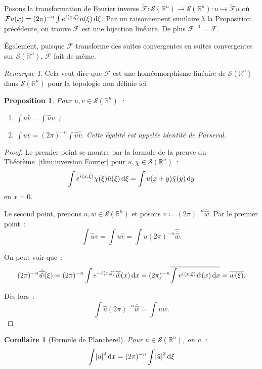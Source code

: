 \documentclass{report}
\newcommand{\R}{{\mathbb R}}
\newcommand{\scpr}[2]{\left\langle#1, #2\right\rangle}
\newcommand{\dx}{\dif x}
\newtheorem{prp}[thm]{Proposition}
\newtheorem{cor}[thm]{Corollaire}
\theoremstyle{definition}
\theoremstyle{remark}
\newtheorem*{rmq}{Remarque}
\begin{document}
Posons la transformation de Fourier inverse $\tilde {\mathcal F} : \mathcal S(\R^n) \to \mathcal S(\R^n) : u \mapsto \tilde {\mathcal F}u$ où
$\tilde {\mathcal F}u(x) = (2\pi)^{-n}\int e^{i\scpr x\xi}u(\xi)\dif\xi$. Par un raisonnement similaire à la Proposition précédente,
on trouve $\tilde {\mathcal F}$ est une bijection linéaire. De plus $\mathcal F^{-1} = \tilde {\mathcal F}$.

Également, puisque $\mathcal F$ transforme des suites convergentes en suites convergentes sur $\mathcal S(\R^n)$, $\tilde {\mathcal F}$ fait de même.

\begin{rmq} Cela veut dire que $\mathcal F$ est une homéomorphisme linéaire de $\mathcal S(\R^n)$ dans $\mathcal S(\R^n)$ pour la topologie non définie ici.
\end{rmq}

\begin{prp} Pour $u, v \in \mathcal S(\R^n)$~:
\begin{enumerate}
	\item $\int u\hat v = \int\hat uv$~;
	\item $\int u\overline v = (2\pi)^{-n}\int \hat u\hat {\overline v}$. Cette égalité est appelée \textit{identité de Parseval}.
\end{enumerate}
\end{prp}

\begin{proof} Le premier point se montre par la formule de la preuve du Théorème~\ref{thm:inversion Fourier} pour $u,\chi \in \mathcal S(\R^n)$~:
\[\int e^{i\scpr x\xi}\chi(\xi)\hat u(\xi)\dif\xi = \int u(x+y)\hat \chi(y)\dif y\]
en $x=0$.

Le second point, prenons $u, w \in \mathcal S(\R^n)$ et posons $v \coloneqq (2\pi)^{-n}\overline {\hat w}$. Par le premier point~:
\[\int \hat uv = \int u\hat v = \int u(2\pi)^{-n}\hat {\overline {\hat w}}.\]

On peut voir que~:
\[(2\pi)^{-n}\hat {\overline {\hat w}}(\xi) = (2\pi)^{-n}\int e^{-i\scpr x\xi}\overline {\hat w}(x)\dx =
	(2\pi)^{-n}\overline {\int e^{i\scpr x\xi}\hat w(x)\dx} = \overline {w(\xi)}.\]

Dès lors~:
\[\int \hat u(2\pi)^{-n}\overline {\hat w} = \int u\overline w.\]
\end{proof}

\begin{cor}[Formule de Plancherel] Pour $u \in \mathcal S(\R^n)$, on a~:
\begin{equation}\label{eq:Plancherel}
	\int \abs u^2\dx = (2\pi)^{-n}\int\abs {\hat u}^2\dif\xi
\end{equation}
\end{cor}
\end{document}
